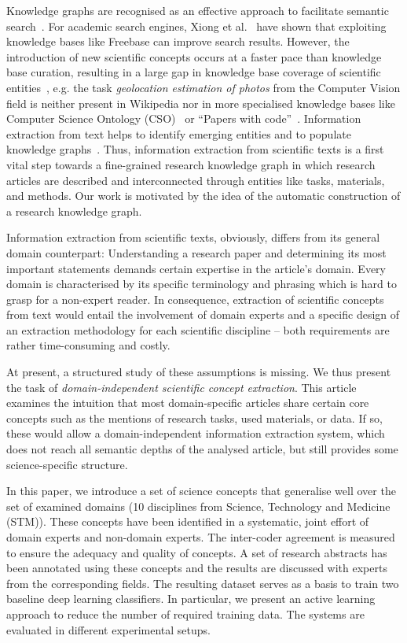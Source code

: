 \documentclass[runningheads]{llncs}
\begin{document}
Knowledge graphs are recognised as an effective approach to facilitate semantic search~\cite{Balog2018EntityOrientedS}. 
For academic search engines, Xiong et al.~\cite{Xiong2017ExplicitSR} have shown that exploiting knowledge bases like Freebase can improve search results. 
However, the introduction of new scientific concepts occurs at a faster pace than knowledge base curation, resulting in a large gap in knowledge base coverage of scientific entities~\cite{Ammar2018ConstructionOT}, 
e.g. the task \textit{geolocation estimation of photos} from the Computer Vision field is neither present in Wikipedia nor in more specialised knowledge bases like Computer Science Ontology (CSO)~\cite{Salatino2018TheCS} or ``Papers with code''~\cite{PWC}.
Information extraction from text helps to identify emerging entities and to populate knowledge graphs~\cite{Balog2018EntityOrientedS}.
Thus, information extraction from scientific texts is a first vital step towards a fine-grained research knowledge graph in which research articles are described and interconnected through entities like tasks, materials, and methods. 
Our work is motivated by the idea of the automatic construction of a research knowledge graph.

Information extraction from scientific texts, obviously, differs from its general domain counterpart: 
Understanding a research paper and determining its most important statements demands certain expertise in the article's domain. 
Every domain is characterised by its specific terminology and phrasing which is hard to grasp for a non-expert reader.
In consequence, extraction of scientific concepts from text would entail the involvement of domain experts and a specific design of an extraction methodology for each scientific discipline -- both requirements are rather time-consuming and costly.

At present, a structured study of these assumptions is missing. 
We thus present the task of \textit{domain-independent scientific concept extraction}. 
This article examines the intuition that most domain-specific articles share certain core concepts such as the mentions of research tasks, used materials, or data. 
If so, these would allow a domain-independent information extraction system, which does not reach all semantic depths of the analysed article, but still provides some science-specific structure.

In this paper, we introduce a set of science concepts that generalise well over the set of examined domains (10 disciplines from Science, Technology and Medicine (STM)). These concepts have been identified in a systematic, joint effort of domain experts and non-domain experts. The inter-coder agreement is measured to ensure the adequacy and quality of concepts. A set of research abstracts has been annotated using these concepts and the results are discussed with experts from the corresponding fields. The resulting dataset serves as a basis to train two baseline deep learning classifiers. In particular, we present an active learning approach to reduce the number of required training data. The systems are evaluated in different experimental setups.
\end{document}
